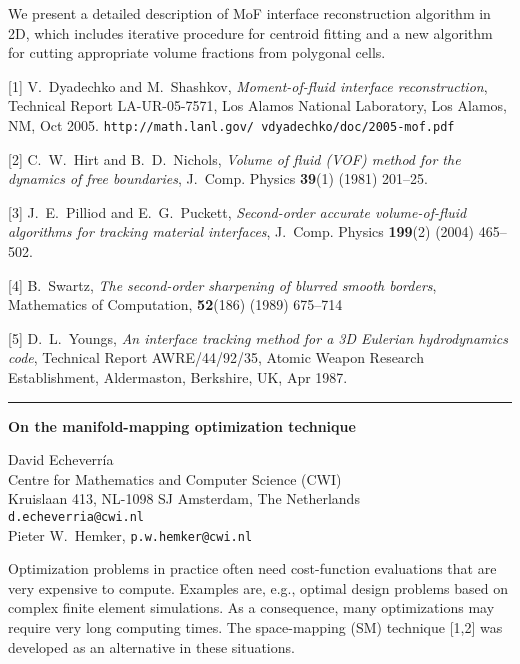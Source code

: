 \documentclass[twosided]{report}
\begin{document}
We
present a detailed description of MoF interface
reconstruction algorithm in 2D, which includes iterative
procedure for centroid fitting and a new algorithm for
cutting appropriate volume fractions from polygonal cells.


[1] V.~Dyadechko and M.~Shashkov, {\em
Moment-of-fluid interface reconstruction},
Technical Report LA-UR-05-7571, Los Alamos
National Laboratory, Los Alamos, NM, Oct 2005.
{\tt http://math.lanl.gov/~vdyadechko/doc/2005-mof.pdf}

[2] C.~W.~Hirt and B.~D.~Nichols, {\em Volume of
fluid (VOF) method for the dynamics of free boundaries},
J.~Comp. Physics {\bf 39}(1) (1981) 201--25.

[3] J.~E.~Pilliod and E.~G.~Puckett, {\em Second-order
accurate volume-of-fluid algorithms for tracking
material interfaces}, J.~Comp. Physics {\bf 199}(2)
(2004) 465--502.

[4] B.~Swartz, {\em The second-order sharpening
of blurred smooth borders}, Mathematics of Computation,
{\bf 52}(186) (1989) 675--714

[5] D.~L.~Youngs, {\em An interface tracking method for a
3D Eulerian hydrodynamics code}, Technical Report
AWRE/44/92/35, Atomic Weapon Research Establishment,
Aldermaston, Berkshire, UK, Apr 1987.


	\begin{center} \rule{6in}{1pt} \end{center}

\begin{center}
{\large			%
{\bf On the manifold-mapping optimization technique}}

	David Echeverr\'{i}a \\
	Centre for Mathematics and Computer Science (CWI)\\
	Kruislaan 413, NL-1098 SJ Amsterdam, The Netherlands \\
	{\tt d.echeverria@cwi.nl} \\
	Pieter W.~Hemker, {\tt p.w.hemker@cwi.nl}
\end{center}
Optimization problems in practice
often need cost-function evaluations that are very expensive
to compute. Examples are, e.g., optimal design problems
based on complex finite element simulations. As a
consequence, many optimizations may require very long
computing times. The space-mapping (SM) technique
[1,2] was developed as an alternative
in these situations.
\end{document}
